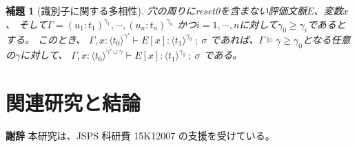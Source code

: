 \documentclass[T]{compsoft}
\newcommand\Resetz{\textbf{reset0}}
\newcommand\codeT[2]{\langle{#1}\rangle^{#2}}
\newcommand\ord{\ge}
\newcommand\lto{\leadsto}
\theoremstyle{break}
\newtheorem{theo}{定理}[section]
\newtheorem{lemm}{補題}[section]
\begin{document}
\begin{lemm}[識別子に関する多相性]
  穴の周りにreset0を含まない評価文脈$E$、変数$x$、
  そして$\Gamma = (u_1:t_1)^{\gamma_1}, \cdots, (u_n:t_n)^{\gamma_n}$
      かつ$i=1,\cdots,n$に対して$\gamma_0 \ord \gamma_i$であるとする。
  このとき、
  $\Gamma, x:\codeT{t_0}{\gamma'} \vdash E[x] : \codeT{t_1}{\gamma_0} ~;~\sigma$
  であれば、$\Gamma \models \gamma \ord \gamma_0$となる任意の$\gamma$に対して、
  $\Gamma, x:\codeT{t_0}{\gamma'\cup \gamma} \vdash 
   E[x] : \codeT{t_1}{\gamma_0} ~;~\sigma$
  である。 
\end{lemm}

%

\section{関連研究と結論}

{\bf 謝辞} 本研究は、JSPS 科研費 15K12007 の支援を受けている。
\end{document}
